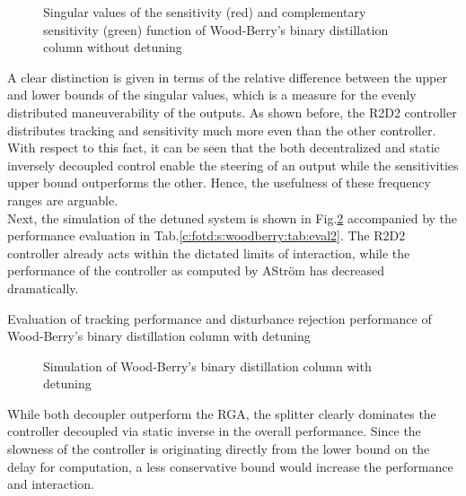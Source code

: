 \begin{figure}[H]\centering

\caption{Singular values of the sensitivity (red) and complementary sensitivity (green) function of Wood-Berry's binary distillation column without detuning}
\label{c:fotd:s:woodberry:f:SingValNotDetuned}
\end{figure}

A clear distinction is given in terms of the relative difference between the upper and lower bounds of the singular values, which is a measure for the evenly distributed maneuverability of the outputs. As shown before, the R2D2 controller distributes tracking and sensitivity much more even than the other controller. With respect to this fact, it can be seen that the both decentralized and static inversely decoupled control enable the steering of an output while the sensitivities upper bound outperforms the other. Hence, the usefulness of these frequency ranges are arguable.\\

Next, the simulation of the detuned system is shown in Fig.\ref{c:fotd:s:woodberry:f:SimDetuned} accompanied by the performance evaluation in Tab.\ref{c:fotd:s:woodberry:tab:eval2}. The R2D2 controller already acts within the dictated limits of interaction, while the performance of the controller as computed by AStr\"om has decreased dramatically.

\begin{table}[H]
\centering
\caption{Evaluation of tracking performance and disturbance rejection performance of Wood-Berry's binary distillation column with detuning}
\label{c:fotd:s:woodberry:tab:eval2}

\end{table}

\begin{figure}[H]\centering

\caption{Simulation of Wood-Berry's binary distillation column with detuning}
\label{c:fotd:s:woodberry:f:SimDetuned}
\end{figure}

While both decoupler outperform the RGA, the splitter clearly dominates the controller decoupled via static inverse in the overall performance. Since the slowness of the controller is originating directly from the lower bound on the delay for computation, a less conservative bound would increase the performance and interaction.\\

